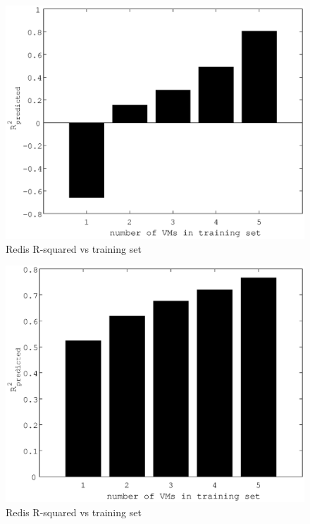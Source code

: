 \documentclass{acm_proc_article-sp}
\begin{document}
\begin{figure}
\centering
\includegraphics[scale = 0.5]{bar_read_avg_latency_r3_2x_r3_x_m3_2x_m3_x_r3__m3_.eps}
\caption{Redis R-squared vs training set}
\label{figure:redisbarread}
\end{figure}


\begin{figure}
\centering
\includegraphics[scale = 0.5]{bar_read_avg_latency_r3_2x_r3__m3_2x_m3__r3_x_m3_x.eps}
\caption{Redis R-squared vs training set}
\label{figure:redisbarread}
\end{figure}
\end{document}
